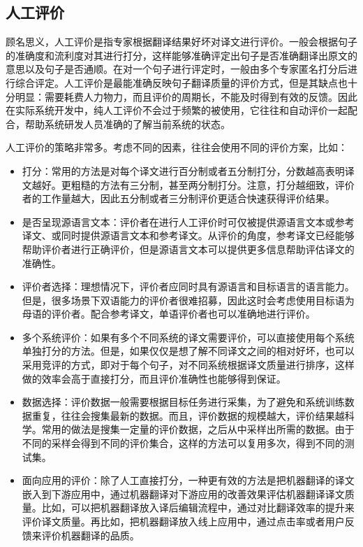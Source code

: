 
\subsection{人工评价}

\parinterval 顾名思义，人工评价是指专家根据翻译结果好坏对译文进行评价。一般会根据句子的准确度和流利度对其进行打分，这样能够准确评定出句子是否准确翻译出原文的意思以及句子是否通顺。在对一个句子进行评定时，一般由多个专家匿名打分后进行综合评定。人工评价是最能准确反映句子翻译质量的评价方式，但是其缺点也十分明显：需要耗费人力物力，而且评价的周期长，不能及时得到有效的反馈。因此在实际系统开发中，纯人工评价不会过于频繁的被使用，它往往和自动评价一起配合，帮助系统研发人员准确的了解当前系统的状态。

\parinterval 人工评价的策略非常多。考虑不同的因素，往往会使用不同的评价方案，比如：

\begin{itemize}
\vspace{0.5em}
\item 打分：常用的方法是对每个译文进行百分制或者五分制打分，分数越高表明译文越好。更粗糙的方法有三分制，甚至两分制打分。注意，打分越细致，评价者的工作量越大，因此五分制或者三分制评价更适合快速获得评价结果。
\vspace{0.5em}
\item 是否呈现源语言文本：评价者在进行人工评价时可仅被提供源语言文本或参考译文、或同时提供源语言文本和参考译文。从评价的角度，参考译文已经能够帮助评价者进行正确评价，但是源语言文本可以提供更多信息帮助评估译文的准确性。
\vspace{0.5em}
\item 评价者选择：理想情况下，评价者应同时具有源语言和目标语言的语言能力。但是，很多场景下双语能力的评价者很难招募，因此这时会考虑使用目标语为母语的评价者。配合参考译文，单语评价者也可以准确地进行评价。
\vspace{0.5em}
\item 多个系统评价：如果有多个不同系统的译文需要评价，可以直接使用每个系统单独打分的方法。但是，如果仅仅是想了解不同译文之间的相对好坏，也可以采用竞评的方式，即对于每个句子，对不同系统根据译文质量进行排序，这样做的效率会高于直接打分，而且评价准确性也能够得到保证。
\vspace{0.5em}
\item 数据选择：评价数据一般需要根据目标任务进行采集，为了避免和系统训练数据重复，往往会搜集最新的数据。而且，评价数据的规模越大，评价结果越科学。常用的做法是搜集一定量的评价数据，之后从中采样出所需的数据。由于不同的采样会得到不同的评价集合，这样的方法可以复用多次，得到不同的测试集。
\vspace{0.5em}
\item 面向应用的评价：除了人工直接打分，一种更有效的方法是把机器翻译的译文嵌入到下游应用中，通过机器翻译对下游应用的改善效果评估机器翻译译文质量。比如，可以把机器翻译放入译后编辑流程中，通过对比翻译效率的提升来评价译文质量。再比如，把机器翻译放入线上应用中，通过点击率或者用户反馈来评价机器翻译的品质。
\vspace{0.5em}
\end{itemize}

